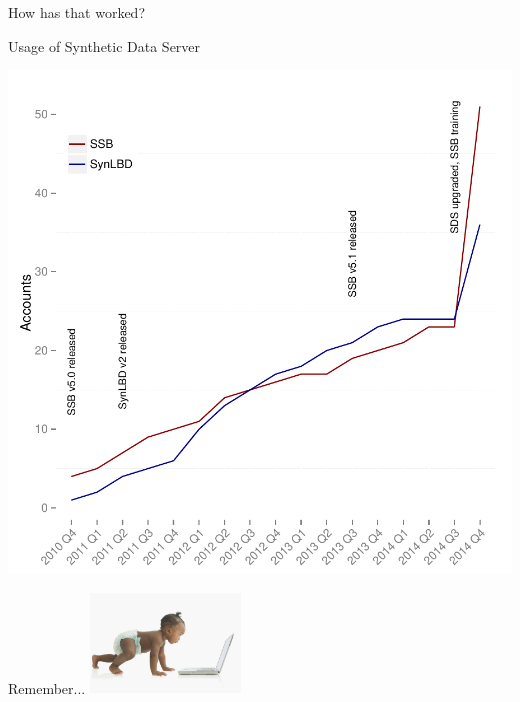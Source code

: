 %


\begin{frame}{How has that worked?}
\begin{block}{Usage of Synthetic Data Server}
\centering

\includegraphics[height=0.8\textheight]{report_on_SDS_2015-accounts.pdf}
\end{block}
\end{frame}


\begin{frame}{Remember...}
\includegraphics[width=0.3\textwidth]{baby.jpg}
\end{frame}




